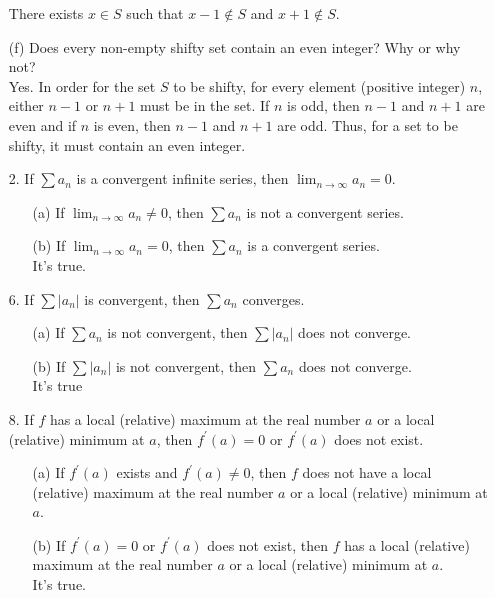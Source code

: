 \documentclass[12pt, a4paper]{article}                  %
\begin{document}
\begin{enumerate}
There exists $x \in S$ such that $x-1 \notin S$ and $x+1 \notin S$.
\\
\item[(f)]
Does every non-empty shifty set contain an even integer? Why or why not?\\

Yes. In order for the set $S$ to be shifty, for every element (positive integer) $n$, either $n - 1$
or $n + 1$ must be in the set. If $n$ is odd, then $n-1$ and $n+1$ are even and if $n$ is even, then
$n-1$ and $n+1$ are odd. Thus, for a set to be shifty, it must contain an even integer.

\item[2.]
If $\sum a_n$ is a convergent infinite series, then $\lim_{n \to \infty} a_n = 0$.
\begin{enumerate}
\item[(a)]
If $\lim_{n \to \infty} a_n \neq 0$, then $\sum a_n$ is not a convergent series.
\item[(b)]
If $\lim_{n \to \infty} a_n = 0$, then $\sum a_n$ is a convergent series.\\
It's true.
\end{enumerate}

\item[6.]
If $\sum |a_n|$ is convergent, then $\sum a_n$ converges.
\begin{enumerate}
\item[(a)]
If $\sum a_n$ is not convergent, then $\sum |a_n|$ does not converge.
\item[(b)]
If $\sum |a_n|$ is not convergent, then $\sum a_n$ does not converge.\\
It's true
\end{enumerate}

\item[8.]
If $f$ has a local (relative) maximum at the real number $a$ or a
local (relative) minimum at $a$, then $f^{'}(a) = 0$ or $f^{'}(a)$ does not exist.
\begin{enumerate}
\item[(a)]
If $f^{'}(a)$ exists and $f^{'}(a) \neq 0$, then $f$ does not have a local
(relative) maximum at the real number $a$ or a local (relative) minimum at $a$.
\item[(b)]
If $f^{'}(a) = 0$ or $f^{'}(a)$ does not exist, then $f$ has a local
(relative) maximum at the real number $a$ or a local (relative) minimum at $a$.\\
It's true.
\end{enumerate}


\end{enumerate}
\end{document}
